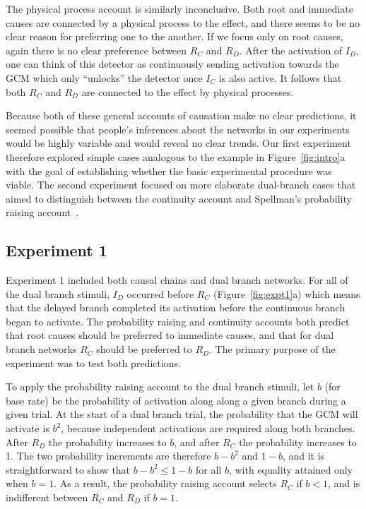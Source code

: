 \documentclass[10pt,letterpaper]{article}
\newcommand{\ev}[2]{$#1_#2$}
\begin{document}
The physical process account is similarly inconclusive. Both root and immediate causes are connected by a physical process to the effect, and there seems to be no clear reason for preferring one to the another. If we focus only on root causes, again there is no clear preference between \ev{R}{C} and \ev{R}{D}. After the activation of \ev{I}{D}, one can think of this detector as continuously sending activation towards the GCM which only ``unlocks'' the detector once \ev{I}{C} is also active. It follows that both \ev{R}{C} and \ev{R}{D} are connected to the effect by physical processes.

Because both of these general accounts of causation make no clear predictions, it seemed possible that people's inferences about the networks in our experiments would be highly variable and would reveal no clear trends. Our first experiment therefore explored simple cases analogous to the example in Figure~\ref{fig:intro}a with the goal of establishing whether the basic experimental procedure was viable.  The second experiment focused on more elaborate dual-branch cases that aimed to distinguish between the continuity account and Spellman's probability raising account~\cite{spellman97}.

\subsection{Experiment 1}

Experiment 1 included both causal chains and dual branch networks. For all of the dual branch stimuli, \ev{I}{D} occurred before \ev{R}{C} (Figure~\ref{fig:expt1}a) which means that the delayed branch completed its activation before the continuous branch began to activate. The probability raising and continuity accounts both predict that root causes should be preferred to immediate causes, and that for dual branch networks \ev{R}{C} should be preferred to \ev{R}{D}.  The primary purpose of the experiment was to test both predictions. 

To apply the probability raising account to the dual branch stimuli, let $b$ (for base rate) be the probability of activation along along a given branch during a given trial. At the start of a dual branch trial, the probability that the GCM will activate is $b^2$, because independent activations are required along both branches. After \ev{R}{D} the probability increases to $b$, and after \ev{R}{C} the probability increases to 1. The two probability increments are therefore $b - b^2$ and $1 - b$, and it is straightforward to show that $b - b^2 \le 1 - b$ for all $b$, with equality attained only when $b = 1$.  As a result, the probability raising account selects \ev{R}{C} if $b<1$, and is indifferent between \ev{R}{C} and \ev{R}{D} if $b = 1$. 
\end{document}
